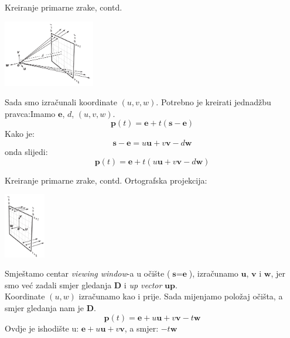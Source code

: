 \documentclass[9pt]{beamer}
\begin{document}
\begin{frame}{Kreiranje primarne zrake, contd.}
\begin{center}
\includegraphics[width=4cm]{slike/ray_viewing_window_perspective.png} 
\end{center} 
Sada smo izračunali koordinate $(u,v, w)$. Potrebno je kreirati jednadžbu pravca:Imamo $\textbf{e}$, $d$, $(u,v, w)$.
$$\textbf{p}(t) = \textbf{e} + t(\textbf{s} - \textbf{e})$$
Kako je:
$$\textbf{s} - \textbf{e} = u\textbf{u} + v\textbf{v} - d\textbf{w}$$
onda slijedi:
$$\textbf{p}(t) = \textbf{e} + t(u\textbf{u} + v\textbf{v} - d\textbf{w})$$
\end{frame}

\begin{frame}{Kreiranje primarne zrake, contd.}
Ortografska projekcija:
\begin{center}
\includegraphics[width=1.8cm]{slike/ray_viewing_window_orthografic.png} 
\end{center} 
Smještamo centar \textit{viewing window}-a u očište ($\textbf{s} = \textbf{e}$), izračunamo $\textbf{u}$, $\textbf{v}$ i $\textbf{w}$, jer smo već zadali smjer gledanja $\textbf{D}$ i \textit{up vector} $\textbf{up}$.\\
Koordinate $(u,w)$ izračunamo kao i prije. Sada mijenjamo položaj očišta, a smjer gledanja nam je $\textbf{D}$.
$$\textbf{p}(t) = \textbf{e} + u\textbf{u} + v\textbf{v} - t\textbf{w}$$
Ovdje je ishodište u: $\textbf{e} + u\textbf{u} + v\textbf{v}$, a smjer:
$- t\textbf{w}$
\end{frame}
\end{document}
